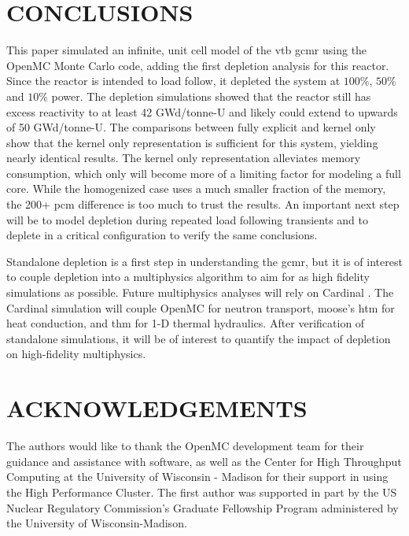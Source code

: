 \documentclass[letterpaper]{physor2024}
\begin{document}
\section{CONCLUSIONS}\label{sec:conclusions}
This paper simulated an infinite, unit cell model of the \gls{vtb} \gls{gcmr} using the OpenMC Monte Carlo code, adding the first depletion analysis for this reactor. Since the reactor is intended to load follow, it depleted the system at $100\%$, $50\%$ and $10\%$ power. The depletion simulations showed that the reactor still has excess reactivity to at least 42 GWd/tonne-U and likely could extend to upwards of 50 GWd/tonne-U. The comparisons between fully explicit and kernel only show that the kernel only representation is sufficient for this system, yielding nearly identical results. The kernel only representation alleviates memory consumption, which only will become more of a limiting factor for modeling a full core. While the homogenized case uses a much smaller fraction of the memory, the 200+ \gls{pcm} difference is too much to trust the results. An important next step will be to model depletion during repeated load following transients and to deplete in a critical configuration to verify the same conclusions.

Standalone depletion is a first step in understanding the \gls{gcmr}, but it is of interest to couple depletion into a multiphysics algorithm to aim for as high fidelity simulations as possible. Future multiphysics analyses will rely on Cardinal \cite{novak2022-cardinal}. The Cardinal simulation will couple OpenMC for neutron transport, \gls{moose}'s \gls{htm} for heat conduction, and \gls{thm} for 1-D thermal hydraulics. After verification of standalone simulations, it will be of interest to quantify the impact of depletion on high-fidelity multiphysics.

\section*{ACKNOWLEDGEMENTS}
The authors would like to thank the OpenMC development team for their guidance and assistance with software, as well as the Center for High Throughput Computing at the University of Wisconsin - Madison for their support in using the High Performance Cluster. The first author was supported in part by the US Nuclear Regulatory Commission's Graduate Fellowship Program administered by the University of Wisconsin-Madison.




\end{document}
